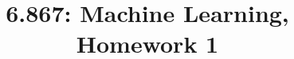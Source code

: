 \documentclass[preprint, 10pt]{sigplanconf}
\begin{document}
\title{6.867: Machine Learning, Homework 1}
\authorinfo{}
\authorinfo{}
\maketitle





\end{document}
